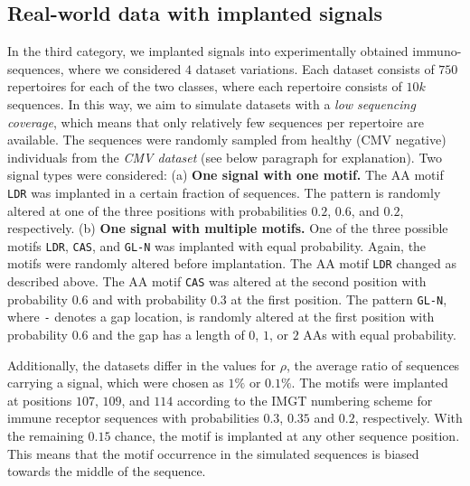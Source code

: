 \documentclass[oneside]{book}
\begin{document}
\subsection{Real-world data with implanted signals}
In the third category, we implanted signals into experimentally obtained 
immuno-sequences, where we considered $4$ dataset variations.
Each dataset consists of $750$ repertoires for each of the two classes, 
where each repertoire consists of $10k$ sequences. In this way, we 
aim to simulate datasets with a \emph{low sequencing coverage}, which
means that only relatively few sequences per repertoire are available.
The sequences were randomly sampled from healthy (CMV negative) individuals from the \emph{CMV dataset} (see below paragraph for explanation).
Two signal types were considered:
(a) \textbf{One signal with one motif.}
The AA motif \texttt{LDR} was implanted in a certain fraction 
of sequences. The pattern is randomly altered at one of the 
three positions with probabilities $0.2$, $0.6$, and $0.2$, 
respectively. 
%
(b) \textbf{One signal with multiple motifs.}
One of the three possible motifs \texttt{LDR}, \texttt{CAS}, and
\texttt{GL-N} was implanted with equal probability. Again, the motifs 
were randomly altered before implantation. 
The AA motif \texttt{LDR} changed as described above. 
The AA motif \texttt{CAS} was altered at the second position with 
probability $0.6$ and with probability $0.3$ at the first position. 
The pattern \texttt{GL-N}, where \texttt{-} denotes a gap location,
is randomly altered at the first position with probability $0.6$ and 
the gap has a length of $0$, $1$, or $2$ AAs with equal probability.
%

Additionally, the datasets differ in the values for $\rho$, the 
average ratio of sequences carrying a signal, 
which were chosen as $1\%$ or $0.1\%$.
%
The motifs were implanted at positions $107$, $109$, and $114$ according to the IMGT numbering scheme for immune receptor sequences \citep{lefranc2003imgt} 
with probabilities $0.3$, $0.35$ and $0.2$, respectively.
With the remaining $0.15$ chance, 
the motif is implanted at any other sequence position.
This means that the motif occurrence in the simulated sequences is biased towards the middle of the sequence.

%
\end{document}
